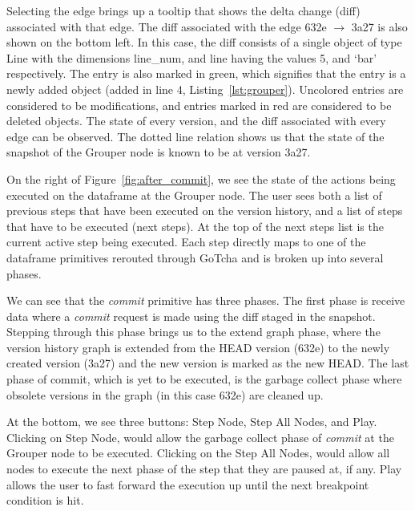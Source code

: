 Selecting the edge brings up a tooltip that shows the delta change (diff) associated with that edge. The diff associated with the edge 632e $\rightarrow$ 3a27 is also shown on the bottom left. In this case, the diff consists of a single object of type Line with the dimensions line\_num, and line having the values 5, and `bar' respectively. The entry is also marked in green, which signifies that the entry is a newly added object (added in line 4, Listing~\ref{lst:grouper}). Uncolored entries are considered to be modifications, and entries marked in red are considered to be deleted objects. The state of every version, and the diff associated with every edge can be observed. The dotted line relation shows us that the state of the snapshot of the Grouper node is known to be at version 3a27. 

On the right of Figure~\ref{fig:after_commit}, we see the state of the actions being executed on the dataframe at the Grouper node. The user sees both a list of previous steps that have been executed on the version history, and a list of steps that have to be executed (next steps). At the top of the next steps list is the current active step being executed. Each step directly maps to one of the dataframe primitives rerouted through GoTcha and is broken up into several phases. 

We can see that the {\em commit} primitive has three phases. The first phase is receive data where a {\em commit} request is made using the diff staged in the snapshot. Stepping through this phase brings us to the extend graph phase, where the version history graph is extended from the HEAD version (632e) to the newly created version (3a27) and the new version is marked as the new HEAD. The last phase of commit, which is yet to be executed, is the garbage collect phase where obsolete versions in the graph (in this case 632e) are cleaned up.


At the bottom, we see three buttons: Step Node, Step All Nodes, and Play. Clicking on Step Node, would allow the garbage collect phase of {\em commit} at the Grouper node to be executed. Clicking on the Step All Nodes, would allow all nodes to execute the next phase of the step that they are paused at, if any. Play allows the user to fast forward the execution up until the next breakpoint condition is hit.


